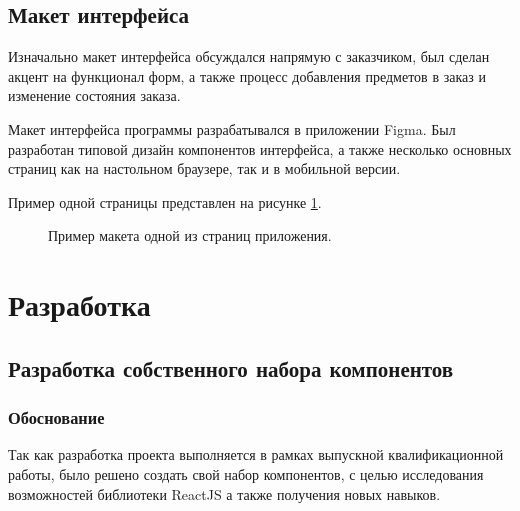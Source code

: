 \documentclass[a4paper,article,14pt]{extarticle}
\begin{document}
\subsection{Макет интерфейса}

Изначально макет интерфейса обсуждался напрямую с заказчиком, был сделан акцент на функционал форм,
 а также процесс добавления предметов в заказ и изменение состояния заказа.

Макет интерфейса программы разрабатывался в приложении Figma. Был разработан типовой дизайн компонентов интерфейса, 
а также несколько основных страниц как на настольном браузере, так и в мобильной версии.

Пример одной страницы представлен на рисунке \ref{mockup}.

\begin{figure}[ht]
\begin{center}
\caption{\label{mockup} Пример макета одной из страниц приложения.}
\end {center}
\end {figure}

\section{Разработка}

\subsection{Разработка собственного набора компонентов}
\subsubsection{Обоснование}

Так как разработка проекта выполняется в рамках выпускной квалификационной работы, было решено создать свой набор компонентов,
с целью исследования возможностей библиотеки ReactJS а также получения новых навыков.
\end{document}
